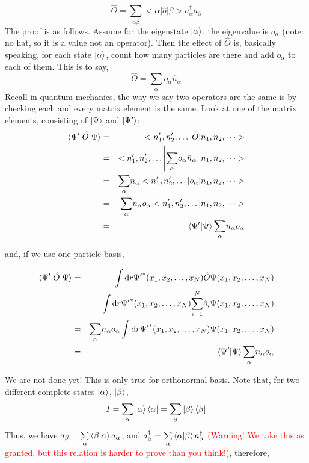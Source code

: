 \documentclass{article}
\begin{document}
\begin{equation}
    \hat{O} = \underset{\alpha \beta}{\sum} < \alpha | \hat{o} | \beta > a_{\alpha}^{\dag}a_{\beta}
\end{equation}
The proof is as follows. Assume for the eigenstate $\ket{\alpha}$, the eigenvalue is $o_{\alpha}$ (note: no hat, so it is a value not an operator). Then the effect of $\hat{O}$ is, basically speaking, for each state $\ket{\alpha}$, count how many particles are there and add $o_{\alpha}$ to each of them. This is to say,
\begin{equation}
    \hat{O} = \underset{\alpha}{\sum} o_{\alpha} \hat{n}_{\alpha}
\end{equation}
Recall in quantum mechanics, the way we say two operators are the same is by checking each and every matrix element is the same. Look at one of the matrix elements, consisting of $\ket{\Psi}$ and $\ket{\Psi'}$:
\begin{eqnarray*}  \braket{\Psi'| \hat{O} | \Psi} & = & < n'_1, n'_2, \dots | \hat{O} | n_1, n_2,  \dots >\\  & = & < n'_1, n'_2, \dots \left| \underset{\alpha}{\sum} o_{\alpha}  \hat{n}_{\alpha} \right| n_1, n_2, \dots >\\  & = & \underset{\alpha}{\sum} n_{\alpha} < n'_1, n'_2, \dots | o_{\alpha}  | n_1, n_2, \dots >\\  & = & \underset{\alpha}{\sum} n_{\alpha} o_{\alpha} < n'_1, n'_2, \dots |   n_1, n_2, \dots >\\  & = & \braket{\Psi'|\Psi} \underset{\alpha}{\sum} n_{\alpha}  o_{\alpha}\end{eqnarray*}

and, if we use one-particle basis,

\begin{eqnarray*}  \braket{\Psi'| \hat{O} | \Psi} & = & \int \text{d} {r \Psi'}^{\ast} (x_1, x_2,  \ldots, x_N) \hat{O} \Psi (x_1, x_2, \ldots, x_N)\\  & = & \int \text{d} {r \Psi'}^{\ast} (x_1, x_2, \ldots, x_N) \underset{i =  1}{\overset{N}{\sum}} \hat{o}_i \Psi (x_1, x_2, \ldots, x_N)\\  & = & \underset{\alpha}{\overset{}{\sum}} n_{\alpha} o_{\alpha} \int  \text{d} {r \Psi'}^{\ast} (x_1, x_2, \ldots, x_N) \Psi (x_1, x_2, \ldots,  x_N)\\  & = & \braket{\Psi'|\Psi} \underset{\alpha}{\sum} n_{\alpha}  o_{\alpha}\end{eqnarray*}

We are not done yet! This is only true for orthonormal basis. Note that, for two different complete states $\ket{\alpha}$, $\ket{\beta}$,
\begin{equation}
    I = \underset{\alpha}{\sum} \ket{\alpha}\bra{\alpha} = \underset{\beta}{\sum} \ket{\beta}\bra{\beta} 
\end{equation}
Thus, we have $a_{\beta} = \underset{\alpha}{\sum} \braket{\beta|\alpha} a_{\alpha}$, and $a^{\dag}_{\beta} = \underset{\alpha}{\sum} \braket{\alpha|\beta} a^{\dag}_{\alpha}$ \textcolor{red}{(Warning! We take this as granted, but this relation is harder to prove than you think!)}, therefore,
\end{document}
